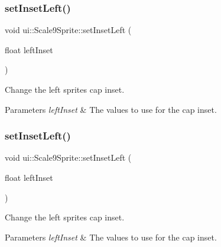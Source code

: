 \subsubsection{\texorpdfstring{set\+Inset\+Left()}{setInsetLeft()}\hspace{0.1cm}{\footnotesize\ttfamily [1/2]}}
{\footnotesize\ttfamily void ui\+::\+Scale9\+Sprite\+::set\+Inset\+Left (\begin{DoxyParamCaption}\item[{float}]{left\+Inset }\end{DoxyParamCaption})}



Change the left sprite\textquotesingle{}s cap inset. 


\begin{DoxyParams}{Parameters}
{\em left\+Inset} & The values to use for the cap inset. \\
\hline
\end{DoxyParams}
\mbox{\label{classui_1_1Scale9Sprite_a7c74dd002fd7fbd2a2afdfc2e69be278}} 
\subsubsection{\texorpdfstring{set\+Inset\+Left()}{setInsetLeft()}\hspace{0.1cm}{\footnotesize\ttfamily [2/2]}}
{\footnotesize\ttfamily void ui\+::\+Scale9\+Sprite\+::set\+Inset\+Left (\begin{DoxyParamCaption}\item[{float}]{left\+Inset }\end{DoxyParamCaption})}



Change the left sprite\textquotesingle{}s cap inset. 


\begin{DoxyParams}{Parameters}
{\em left\+Inset} & The values to use for the cap inset. \\
\hline
\end{DoxyParams}
\mbox{\label{classui_1_1Scale9Sprite_a7276d1dcf47579a368948f1cf84a3c41}} 
